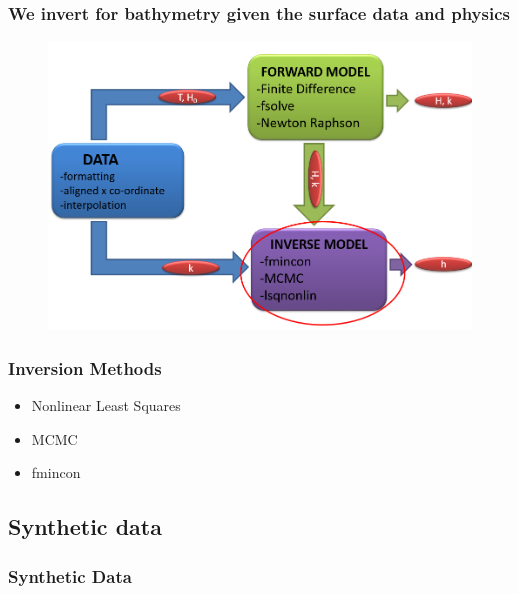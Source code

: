 \documentclass[7pt]{beamer}
\begin{document}
\begin{frame}
 \frametitle{We invert for bathymetry given the surface data and physics}

\begin{figure}[flowchart]
\includegraphics[width=1.0\linewidth]{img/INV.png}\hfill
\end{figure}


\end{frame}

\begin{frame}
 \frametitle{Inversion Methods}

\begin{itemize}
\item Nonlinear Least Squares
\item MCMC
\item fmincon
\end{itemize}

\end{frame}


% 
\subsection{Synthetic data}
\begin{frame}
 \frametitle{Synthetic Data}
\end{frame}
\end{document}
